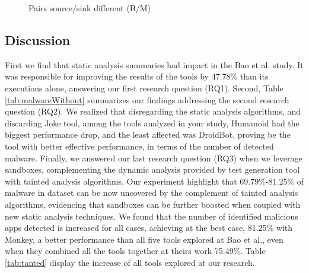 \begin{figure}[ht]%
    \centering
    \qquad
    \caption{Pairs source/sink different (B/M)}%
    \label{fig:sourcesink}%
\end{figure}

\subsection{Discussion}\label{sec:discussion}

First we find that static analysis summaries had impact in the Bao et al. study. It was responsible for improving the results of the tools by 47.78\% than its executions alone, answering our first research question (RQ1). Second, Table \ref{tab:malwareWithout} summarizes our findings addressing the second research question (RQ2). We realized that disregarding the static analysis algorithms, and discarding Joke tool, among the tools analyzed in your study, Humanoid had the biggest performance drop, and the least affected was DroidBot, proving be the tool with better effective performance, in terms of the number of detected malware. Finally, we answered our last research question (RQ3) when we leverage sandboxes, complementing the dynamic analysis provided by test generation tool with tainted analysis algorithms. Our experiment highlight that 69.79\%-81.25\% of malware in dataset can be now uncovered by the complement of tainted analysis algorithms, evidencing that 
sandboxes can be further boosted when coupled with new static analysis techniques. We found that the number of identified malicious apps detected is increased for all cases, achieving at the best case, 81.25\% with Monkey, a better performance than all five tools explored at Bao et al., even when they combined all the tools together at theirs work 75.49\%. Table \ref{tab:tanted} display the increase of all tools explored at our research.

